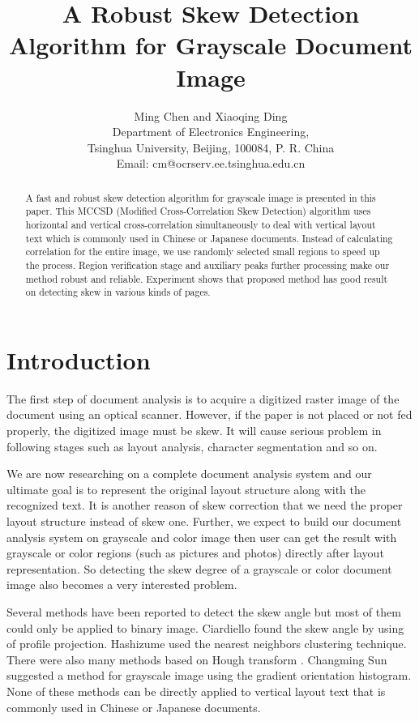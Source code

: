 \documentclass[conference]{IEEEtran}
\title{A Robust Skew Detection Algorithm for Grayscale Document Image}
\author{Ming Chen and Xiaoqing Ding\\
	Department of Electronics Engineering,\\
	Tsinghua University, Beijing, 100084, P. R. China\\
	Email: cm@ocrserv.ee.tsinghua.edu.cn}
\begin{document}
	\maketitle
	
	\begin{abstract}
		A fast and robust skew detection algorithm for grayscale image is presented in this paper. This MCCSD (Modified Cross-Correlation Skew Detection) algorithm uses horizontal and vertical cross-correlation simultaneously to deal with vertical layout text which is commonly used in Chinese or Japanese documents. Instead of calculating correlation for the entire image, we use randomly selected small regions to speed up the process. Region verification stage and auxiliary peaks further processing make our method robust and reliable. Experiment shows that proposed method has good result on detecting skew in various kinds of pages.
	\end{abstract}
	
	\section{Introduction}
	The first step of document analysis is to acquire a digitized raster image of the document using an optical scanner. However, if the paper is not placed or not fed properly, the digitized image must be skew. It will cause serious problem in following stages such as layout analysis, character segmentation and so on.
	
	We are now researching on a complete document analysis system and our ultimate goal is to represent the original layout structure along with the recognized text. It is another reason of skew correction that we need the proper layout structure instead of skew one. Further, we expect to build our document analysis system on grayscale and color image then user can get the result with grayscale or color regions (such as pictures and photos) directly after layout representation. So detecting the skew degree of a grayscale or color document image also becomes a very interested problem.
	
	Several methods have been reported to detect the skew angle but most of them could only be applied to binary image. Ciardiello \cite{ciardiello88} found the skew angle by using of profile projection. Hashizume \cite{hashizume86} used the nearest neighbors clustering technique. There were also many methods based on Hough transform \cite{yu96,jiang97}. Changming Sun \cite{sun97} suggested a method for grayscale image using the gradient orientation histogram. None of these methods can be directly applied to vertical layout text that is commonly used in Chinese or Japanese documents.
	
\end{document}

